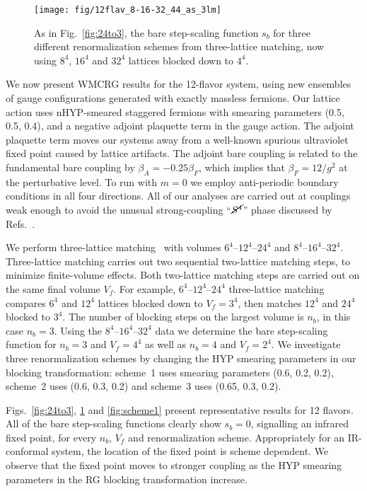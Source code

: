 \documentclass{PoS}
\newcommand{\Sb}{\ensuremath{\cancel{S^4}} }
\newcommand{\fig}[1]{Fig.~\ref{#1}}
\begin{document}
\begin{figure}[ht]
  \centering
  \texttt{[image: fig/12flav\_8-16-32\_44\_as\_3lm]}
  \caption{As in \protect\fig{fig:24to3}, the bare step-scaling function $s_b$ for three different renormalization schemes from three-lattice matching, now using $8^4$, $16^4$ and $32^4$ lattices blocked down to $4^4$.}
  \label{fig:32to4}
\end{figure}

We now present WMCRG results for the 12-flavor system, using new ensembles of gauge configurations generated with exactly massless fermions.
Our lattice action uses nHYP-smeared staggered fermions with smearing parameters (0.5, 0.5, 0.4), and a negative adjoint plaquette term in the gauge action.
The adjoint plaquette term moves our systems away from a well-known spurious ultraviolet fixed point caused by lattice artifacts.
The adjoint bare coupling is related to the fundamental bare coupling by $\beta_A = -0.25\beta_F$, which implies that $\beta_F = 12 / g^2$ at the perturbative level.
To run with $m = 0$ we employ anti-periodic boundary conditions in all four directions.
All of our analyses are carried out at couplings weak enough to avoid the unusual strong-coupling ``$\Sb$'' phase discussed by Refs.~\cite{Cheng:2011ic, Hasenfratz:2013uha}.

We perform three-lattice matching~\cite{Hasenfratz:2011xn} with volumes $6^4$--$12^4$--$24^4$ and $8^4$--$16^4$--$32^4$.
Three-lattice matching carries out two sequential two-lattice matching steps, to minimize finite-volume effects.
Both two-lattice matching steps are carried out on the same final volume $V_f$.
For example, $6^4$--$12^4$--$24^4$ three-lattice matching compares $6^4$ and $12^4$ lattices blocked down to $V_f = 3^4$, then matches $12^4$ and $24^4$ blocked to $3^4$.
The number of blocking steps on the largest volume is $n_b$, in this case $n_b = 3$.
Using the $8^4$--$16^4$--$32^4$ data we determine the bare step-scaling function for $n_b = 3$ and $V_f = 4^4$ as well as $n_b = 4$ and $V_f = 2^4$.
We investigate three renormalization schemes by changing the HYP smearing parameters in our blocking transformation: scheme~1 uses smearing parameters (0.6, 0.2, 0.2), scheme~2 uses (0.6, 0.3, 0.2) and scheme~3 uses (0.65, 0.3, 0.2).

Figs.~\ref{fig:24to3}, \ref{fig:32to4} and \ref{fig:scheme1} present representative results for 12 flavors.
All of the bare step-scaling functions clearly show $s_b = 0$, signalling an infrared fixed point, for every $n_b$, $V_f$ and renormalization scheme.
Appropriately for an IR-conformal system, the location of the fixed point is scheme dependent.
We observe that the fixed point moves to stronger coupling as the HYP smearing parameters in the RG blocking transformation increase.
\end{document}
